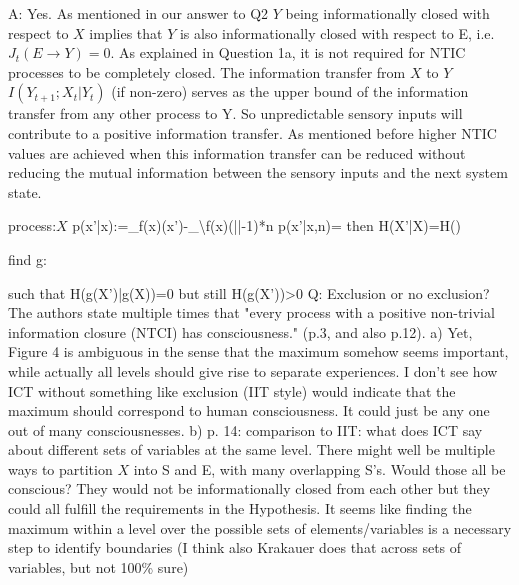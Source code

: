 \documentclass[utf8]{article}
\newcounter{cQuestion}[section]
\newenvironment{question}
    {\refstepcounter{cQuestion}\color{Blue}\noindent\newline Q\thecQuestion:}
    {~\newline}
\newenvironment{ans}  
    {\color{Black}\noindent A:}
    {~\newline}
\begin{document}
        \begin{ans}
            Yes. As mentioned in our answer to Q2 $Y$ being informationally closed with respect to $X$ implies that $Y$ is also informationally closed with respect to E, i.e. $J_t(E\rightarrow Y) = 0$.
            As explained in Question 1a, it is not required for NTIC processes to be completely closed. The information transfer from $X$ to $Y$ $I(Y_{t+1}; X_t|Y_t)$ (if non-zero) serves as the upper bound of the information transfer from any other process to Y. So unpredictable sensory inputs will contribute to a positive information transfer. 
            As mentioned before higher NTIC values are achieved when this information transfer can be reduced without reducing the mutual information between the sensory inputs and the next system state.
        \end{ans}
        
        
        process:$X$
        p(x'|x):=\delta_{f(x)}(x')-\delta_{\X\backslash f(x)}(|\X|-1)*n
        p(x'|x,n)=
        then H(X'|X)=H(\Epsilon)
        
        find g:\X \rightarrow \Y
        
        such that H(g(X')|g(X))=0
        but still H(g(X'))>0
        \begin{question}
            Exclusion or no exclusion? The authors state multiple times that "every process with a positive non-trivial information closure (NTCI) has consciousness." (p.3, and also p.12).
            a) Yet, Figure 4 is ambiguous in the sense that the maximum somehow seems important, while actually all levels should give rise to separate experiences. I don't see how ICT without something like exclusion (IIT style) would indicate that the maximum should correspond to human consciousness. It could just be any one out of many consciousnesses.
            b) p. 14: comparison to IIT: what does ICT say about different sets of variables at the same level. There might well be multiple ways to partition $X$ into S and E, with many overlapping S's. Would those all be conscious? They would not be informationally closed from each other but they could all fulfill the requirements in the Hypothesis. It seems like finding the maximum within a level over the possible sets of elements/variables is a necessary step to identify boundaries (I think also Krakauer does that across sets of variables, but not 100\% sure)        
        \end{question}
    
\end{document}
